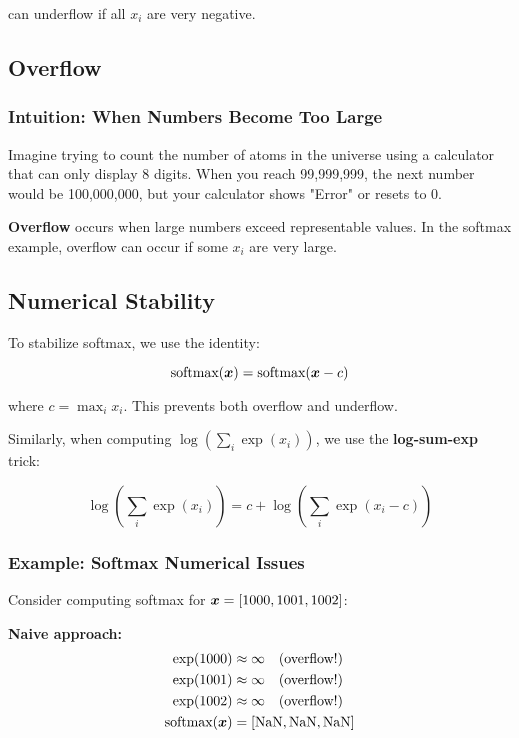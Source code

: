 can underflow if all $x_i$ are very negative.

\subsection{Overflow}

\subsubsection{Intuition: When Numbers Become Too Large}

Imagine trying to count the number of atoms in the universe using a calculator that can only display 8 digits. When you reach 99,999,999, the next number would be 100,000,000, but your calculator shows "Error" or resets to 0.

\textbf{Overflow} occurs when large numbers exceed representable values. In the softmax example, overflow can occur if some $x_i$ are very large.

\subsection{Numerical Stability}

To stabilize softmax, we use the identity:

\begin{equation}
\text{softmax}(\boldsymbol{x}) = \text{softmax}(\boldsymbol{x} - c)
\end{equation}

where $c = \max_i x_i$. This prevents both overflow and underflow.

Similarly, when computing $\log(\sum_i \exp(x_i))$, we use the \textbf{log-sum-exp} trick:

\begin{equation}
\log\left(\sum_i \exp(x_i)\right) = c + \log\left(\sum_i \exp(x_i - c)\right)
\end{equation}

\subsubsection{Example: Softmax Numerical Issues}

Consider computing softmax for $\boldsymbol{x} = [1000, 1001, 1002]$:

\textbf{Naive approach:}
\begin{align}
\exp(1000) &\approx \infty \quad \text{(overflow!)} \\
\exp(1001) &\approx \infty \quad \text{(overflow!)} \\
\exp(1002) &\approx \infty \quad \text{(overflow!)} \\
\text{softmax}(\boldsymbol{x}) &= [\text{NaN}, \text{NaN}, \text{NaN}]
\end{align}

